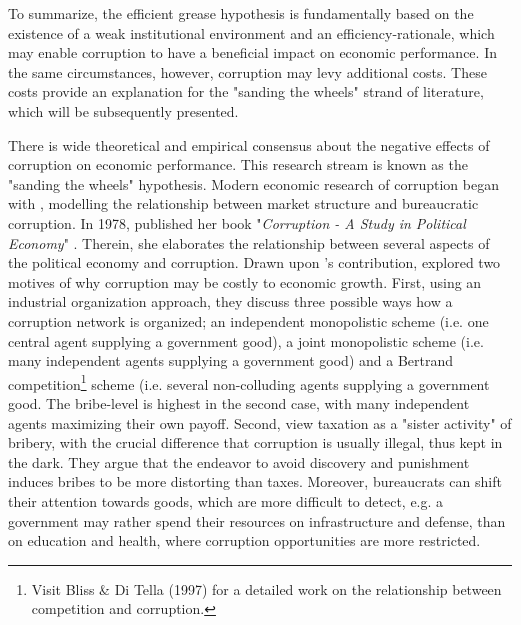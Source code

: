 To summarize, the efficient grease hypothesis is fundamentally based on the existence of a weak institutional environment and an efficiency-rationale, which may enable corruption to have a beneficial impact on economic performance. In the same circumstances, however, corruption may levy additional costs. These costs provide an explanation for the "sanding the wheels" strand of literature, which will be subsequently presented. \citep[p. 73]{meon2005does}\\ 
\newline
\vspace{0.25cm}{\bf Sand the wheels hypothesis}

There is wide theoretical and empirical consensus about the negative effects of corruption on economic performance. This research stream is known as the "sanding the wheels" hypothesis. Modern economic research of corruption began with \citet{rose1975economics}, modelling the relationship between market structure and bureaucratic corruption. In 1978, \citeauthor{ackerman1978corruption} published her book "{\it Corruption - A Study in Political Economy}" . Therein, she elaborates the relationship between several aspects of the political economy  and corruption. Drawn upon \citeauthor{rose1975economics}'s contribution, \citet[pp. 600--612]{shleifer1993corruption} explored two motives of why corruption may be costly to economic growth. First, using an industrial organization approach, they discuss three possible ways how a corruption network is organized; an independent monopolistic scheme (i.e. one central agent supplying a government good), a joint monopolistic scheme (i.e. many independent agents supplying a government good) and a Bertrand competition\footnote{Visit Bliss \& Di Tella (1997) for a detailed work on the relationship between competition and corruption.} scheme (i.e. several non-colluding agents supplying a government good.  The bribe-level is highest in the second case, with many independent agents maximizing their own payoff. Second, \citet[pp. 612--615]{shleifer1993corruption} view taxation as a "sister activity" of bribery, with the crucial difference that corruption is usually illegal, thus kept in the dark. They argue that the endeavor to avoid discovery and punishment induces bribes to be more distorting than taxes. Moreover, bureaucrats can shift their attention towards goods, which are more difficult to detect, e.g. a government may rather spend their resources on infrastructure and defense, than on education and health, where corruption opportunities are more restricted.

